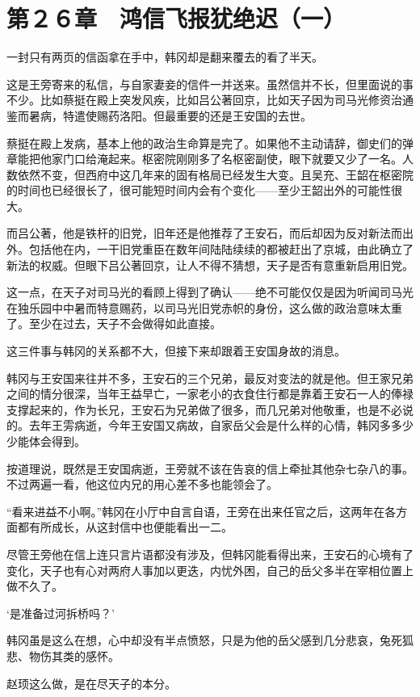 \section{第２６章　鸿信飞报犹绝迟（一）}

一封只有两页的信函拿在手中，韩冈却是翻来覆去的看了半天。

这是王旁寄来的私信，与自家妻妾的信件一并送来。虽然信并不长，但里面说的事不少。比如蔡挺在殿上突发风疾，比如吕公著回京，比如天子因为司马光修资治通鉴而暑病，特遣使赐药洛阳。但最重要的还是王安国的去世。

蔡挺在殿上发病，基本上他的政治生命算是完了。如果他不主动请辞，御史们的弹章能把他家门口给淹起来。枢密院刚刚多了名枢密副使，眼下就要又少了一名。人数依然不变，但西府中这几年来的固有格局已经发生大变。且吴充、王韶在枢密院的时间也已经很长了，很可能短时间内会有个变化——至少王韶出外的可能性很大。

而吕公著，他是铁杆的旧党，旧年还是他推荐了王安石，而后却因为反对新法而出外。包括他在内，一干旧党重臣在数年间陆陆续续的都被赶出了京城，由此确立了新法的权威。但眼下吕公著回京，让人不得不猜想，天子是否有意重新启用旧党。

这一点，在天子对司马光的看顾上得到了确认——绝不可能仅仅是因为听闻司马光在独乐园中中暑而特意赐药，以司马光旧党赤帜的身份，这么做的政治意味太重了。至少在过去，天子不会做得如此直接。

这三件事与韩冈的关系都不大，但接下来却跟着王安国身故的消息。

韩冈与王安国来往并不多，王安石的三个兄弟，最反对变法的就是他。但王家兄弟之间的情分很深，当年王益早亡，一家老小的衣食住行都是靠着王安石一人的俸禄支撑起来的，作为长兄，王安石为兄弟做了很多，而几兄弟对他敬重，也是不必说的。去年王雱病逝，今年王安国又病故，自家岳父会是什么样的心情，韩冈多多少少能体会得到。

按道理说，既然是王安国病逝，王旁就不该在告哀的信上牵扯其他杂七杂八的事。不过两遍一看，他这位内兄的用心差不多也能领会了。

“看来进益不小啊。”韩冈在小厅中自言自语，王旁在出来任官之后，这两年在各方面都有所成长，从这封信中也便能看出一二。

尽管王旁他在信上连只言片语都没有涉及，但韩冈能看得出来，王安石的心境有了变化，天子也有心对两府人事加以更迭，内忧外困，自己的岳父多半在宰相位置上做不久了。

‘是准备过河拆桥吗？’

韩冈虽是这么在想，心中却没有半点愤怒，只是为他的岳父感到几分悲哀，兔死狐悲、物伤其类的感怀。

赵顼这么做，是在尽天子的本分。

